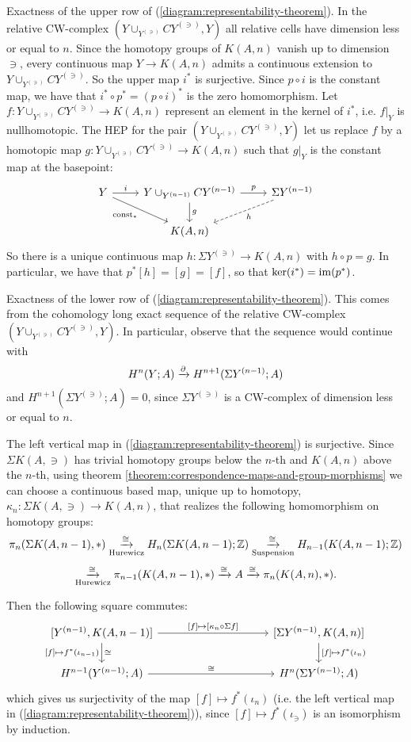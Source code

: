Exactness of the upper row of (\ref{diagram:representability-theorem}). In the relative CW-complex $(Y\cup_{Y^{(\ni)}}CY^{(\ni)},Y)$ all relative cells have dimension less or equal to $n$. Since the homotopy groups of $K(A,n)$ vanish up to dimension $\ni$, every continuous map $Y\to K(A,n)$ admits a continuous extension to $Y\cup_{Y^{(\ni)}}CY^{(\ni)}$. So the upper map $i^*$ is surjective. Since $p\circ i$ is the constant map, we have that $i^*\circ p^*=(p\circ i)^*$ is the zero homomorphism. Let $f:Y\cup_{Y^{(\ni)}}CY^{(\ni)}\to K(A,n)$ represent an element in the kernel of $i^*$, i.e. $f|_Y$ is nullhomotopic. The HEP for the pair $(Y\cup_{Y^{(\ni)}}CY^{(\ni)},Y)$ let us replace $f$ by a homotopic map $g:Y\cup_{Y^{(\ni)}}CY^{(\ni)}\to K(A,n)$ such that $g|_Y$ is the constant map at the basepoint:
\[
\begin{tikzcd}
Y \ar[dr,"\const_*"'] \ar[r,"i"] & Y\cup_{Y^{(\ni)}}CY^{(\ni)} \ar[d,"g"] \ar[r,"p"] & \Sigma Y^{(\ni)} \ar[dl,dashed,"h"]\\
& K(A,n) &
\end{tikzcd}
\]
So there is a unique continuous map $h:\Sigma Y^{(\ni)}\to K(A,n)$ with $h\circ p=g$. In particular, we have that $p^*[h]=[g]=[f]$, so that $\ker(i^*)=\operatorname{im}(p^*)$.

Exactness of the lower row of (\ref{diagram:representability-theorem}). This comes from the cohomology long exact sequence of the relative CW-complex $(Y\cup_{Y^{(\ni)}}CY^{(\ni)},Y)$. In particular, observe that the sequence would continue with
\[H^n(Y;A)\xrightarrow{\partial} H^{n+1}(\Sigma Y^{({n-1})};A)\]
and $H^{n+1}(\Sigma Y^{(\ni)};A)=0$, since $\Sigma Y^{(\ni)}$ is a CW-complex of dimension less or equal to $n$.

The left vertical map in (\ref{diagram:representability-theorem}) is surjective. Since $\Sigma K(A,\ni)$ has trivial homotopy groups below the $n$-th and $K(A,n)$ above the $n$-th, using theorem \ref{theorem:correspondence-maps-and-group-morphisms} we can choose a continuous based map, unique up to homotopy, $\kappa_n:\Sigma K(A,\ni)\to K(A,n)$, that realizes the following homomorphism on homotopy groups:
\[
    \pi_n(\Sigma K(A,{n-1}),*)\underset{\text{Hurewicz}}{\xrightarrow{\cong}}H_n(\Sigma K(A,{n-1});{\mathbb Z})\underset{\text{Suspension}}{\xrightarrow{\cong}} H_{n-1}(K(A,{n-1});{\mathbb Z})
\]
\[
    \underset{\text{Hurewicz}}{\xrightarrow{\cong}}\pi_{n-1}(K(A,{n-1}),*)\xrightarrow{\cong}A\xrightarrow{\cong}\pi_n(K(A,n),*).
\]

Then the following square commutes:
\[
\begin{tikzcd}[column sep=10em]
{[Y^{(\ni)},K(A,\ni)]} \ar[d,"\cong","{[f]}\mapsto f^*(\iota_\ni)"'] \ar[r,"{[f]}\mapsto{[\kappa_n\circ\Sigma f]}"] & {[\Sigma Y^{(\ni)},K(A,n)]} \ar[d,"{[f]}\mapsto f^*(\iota_n)"]\\
H^\ni(Y^{(\ni)};A) \ar[r,"\cong"] & H^n(\Sigma Y^{(\ni)};A)
\end{tikzcd}
\]
which gives us surjectivity of the map ${[f]}\mapsto f^*(\iota_n)$ (i.e. the left vertical map in (\ref{diagram:representability-theorem})), since ${[f]}\mapsto f^*(\iota_\ni)$ is an isomorphism by induction.

